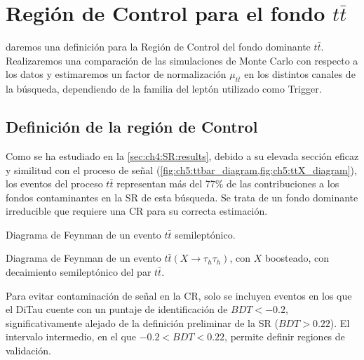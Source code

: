 \chapter[Región de Control para el fondo \texorpdfstring{$t\overline{t}$}{ttbar}]{Región de Control para el fondo \texorpdfstring{$t\bar{t}$}{ttbar}} \label{chap:ch5}

 daremos una definición para la Región de Control del fondo dominante $t\bar{t}$. Realizaremos una comparación de las simulaciones de Monte Carlo con respecto a los datos y estimaremos un factor de normalización $\mu_{t\bar{t}}$ en los distintos canales de la búsqueda, dependiendo de la familia del leptón utilizado como Trigger.



\section{Definición de la región de Control}

Como se ha estudiado en la \cref{sec:ch4:SR:results}, debido a su elevada sección eficaz y similitud con el proceso de señal (\cref{fig:ch5:ttbar_diagram,fig:ch5:ttX_diagram}), los eventos del proceso $t\bar{t}$ representan más del 77\% de las contribuciones a los fondos contaminantes en la SR de esta búsqueda. Se trata de un fondo dominante irreducible que requiere una CR para su correcta estimación.

\begin{marginfigure}
    \centering
    \resizebox{0.9\linewidth}{!}{}
    \caption{Diagrama de Feynman de un evento $t\bar{t}$ semileptónico.}
    \label{fig:ch5:ttbar_diagram}
\end{marginfigure}

\begin{marginfigure}
    \centering
    \resizebox{0.9\linewidth}{!}{\ttXdiagram}
    \caption{Diagrama de Feynman de un evento $t\bar{t}(X \to \tau_h \tau_h)$, con $X$ boosteado, con decaimiento semileptónico del par $t\bar{t}$.}
    \label{fig:ch5:ttX_diagram}
\end{marginfigure}

Para evitar contaminación de señal en la CR, solo se incluyen eventos en los que el DiTau cuente con un puntaje de identificación de $BDT < -0.2$, significativamente alejado de la definición preliminar de la SR ($BDT > 0.22$). El intervalo intermedio, en el que $-0.2 < BDT < 0.22$, permite definir regiones de validación.

